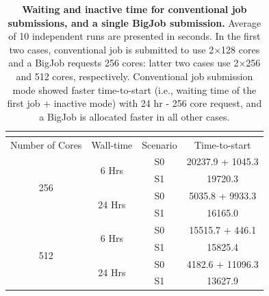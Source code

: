 \documentclass[preprint,12pt]{elsarticle}
\begin{document}
\begin{table}
  \caption{\small {\bf Waiting and inactive time for conventional job submissions, 
and a single BigJob submission.} Average of 10 independent runs are presented in seconds. 
In the first two cases, conventional job is submitted to use 2$\times$128 cores and 
a BigJob requests 256 cores: latter two cases use 2$\times$256 and 512 cores, 
respectively. Conventional job submission mode showed faster time-to-start 
(i.e., waiting time of the first job + inactive mode) with 24 hr - 256 core request,
and a BigJob is allocated faster in all other cases.}
\label{table:BJwaiting}
\centering
\footnotesize
 \begin{tabular}{c | c | c | c }
 \multicolumn{4}{c}{\phantom{\tiny 100}}\\
\hline
Number of Cores & Wall-time & Scenario & Time-to-start\\
\hline
\hline
\multirow{4}{0.1\textwidth}{256} & \multirow{2}{0.1\textwidth}{6 Hrs} & S0 & 20237.9 + 1045.3\\
\cline{3-4}
&  & S1 & 19720.3\\
\cline{2-4}
& \multirow{2}{0.1\textwidth}{24 Hrs} & S0 & 5035.8 + 9933.3\\
\cline{3-4}
&  & S1 & 16165.0\\
\hline
 \multirow{4}{0.1\textwidth}{512}& \multirow{2}{0.1\textwidth}{6 Hrs} & S0 & 15515.7 + 446.1\\
\cline{3-4}
&  & S1 & 15825.4\\
\cline{2-4}
& \multirow{2}{0.1\textwidth}{24 Hrs} & S0 & 4182.6 + 11096.3\\
\cline{3-4}
&  & S1 & 13627.9\\
\hline
\end{tabular} %
\vspace{-1em}
\end{table}
\end{document}
